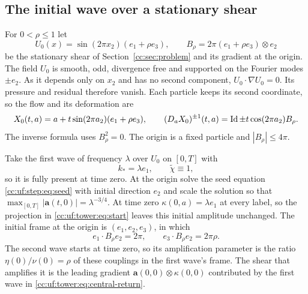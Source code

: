 \subsection{The initial wave over a stationary shear}\label{cc:uf:sec:first-wave}
For $0<\rho\le1$ let
\begin{equation}\label{cc:uf:base:eq:stationary}
 U_0(x)=\sin(2\pi x_2)(e_1+\rho e_3),\qquad B_\rho=2\pi(e_1+\rho e_3)\otimes e_2
\end{equation}
be the stationary shear of Section~\ref{cc:sec:problem} and its gradient
at the origin. The field $U_0$ is smooth, odd, divergence free and
supported on the Fourier modes $\pm e_2$. As it depends only on $x_2$
and has no second component, $U_0\cdot\nabla U_0=0$. Its pressure and
residual therefore vanish. Each particle keeps its second coordinate,
so the flow and its deformation are
\begin{equation}\label{cc:uf:base:eq:deformation}
 X_0(t,a)=a+t\sin(2\pi a_2)(e_1+\rho e_3),\qquad
 (D_aX_0)^{\pm1}(t,a)=\operatorname{Id}\pm t\cos(2\pi a_2) B_\rho.
\end{equation}
The inverse formula uses $B_\rho^2=0$. The origin is a fixed particle and
$|B_\rho|\le4\pi$.

Take the first wave of frequency $\lambda$ over $U_0$ on $[0,T]$ with
\begin{equation}\label{cc:uf:base:eq:first-wave}
 k_*=\lambda e_1,\qquad \widetilde\chi\equiv1,
\end{equation}
so it is fully present at time zero. At the origin solve the seed
equation \eqref{cc:uf:step:eq:seed} with initial direction $e_2$ and
scale the solution so that $\max_{[0,T]}|\mathbf a(t,0)|=\lambda^{-3/4}$.
At time zero $\kappa(0,a)=\lambda e_1$ at every label, so the projection
in \eqref{cc:uf:tower:eq:start} leaves this initial amplitude unchanged.
The initial frame at the origin is $(e_1,e_2,e_3)$, in which
\begin{equation}\label{cc:uf:base:eq:shear-couplings}
 e_1\cdot B_\rho e_2=2\pi,\qquad e_3\cdot B_\rho e_2=2\pi\rho .
\end{equation}
The second wave starts at time zero, so its amplification parameter is
the ratio $\eta(0)/\nu(0)=\rho$ of these couplings in the first wave's
frame. The shear that amplifies it is the leading
gradient $\mathbf a(0,0)\otimes\kappa(0,0)$ contributed by the first
wave in \eqref{cc:uf:tower:eq:central-return}.

